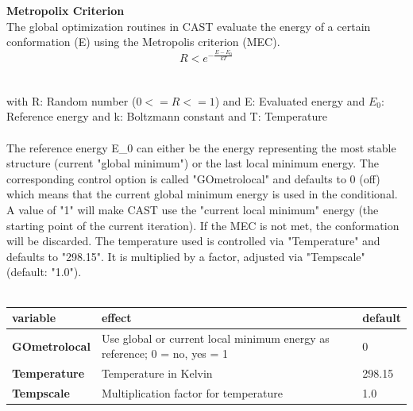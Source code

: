 \documentclass[10pt,a4paper]{article} %
\begin{document}
{	%
	\textbf{Metropolix Criterion} \\
	The global optimization routines in CAST evaluate the energy of a certain conformation (E) using the Metropolis criterion (MEC).
	\begin{equation}
	R < e^{-\frac{E-E_0}{kT}}
	\end{equation}
	\\~\\
	with R: Random number ($0 <= R <= 1$)
	and E: Evaluated energy
	and $E_0$: Reference energy
	and k: Boltzmann constant
	and T: Temperature\\~\\

	The reference energy E_0 can either be the energy representing the most stable structure (current "global minimum") or the last local minimum energy. The corresponding control option is called "GOmetrolocal" and defaults to 0 (off) which means that the current global minimum energy is used in the conditional. A value of "1" will make CAST use the "current local minimum" energy (the starting point of the current iteration). If the MEC is not met, the conformation will be discarded.
	The temperature used is controlled via "Temperature" and defaults to "298.15". It is multiplied by a factor, adjusted via "Tempscale" (default: "1.0").\\~\\

	\begin{tabularx}{\textwidth}{l|X|X}
		variable & effect & default\\
		\hline
		\textbf{GOmetrolocal} & Use global or current local minimum energy as reference; 0 = no, yes = 1 & 0 \\
		\textbf{Temperature} & Temperature in Kelvin & 298.15 \\
		\textbf{Tempscale} & Multiplication factor for temperature & 1.0
	\end{tabularx}

}
\end{document}
